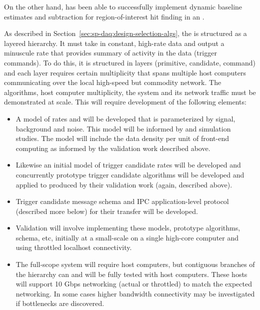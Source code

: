 On the other hand, \microboone has been able to
successfully implement dynamic baseline estimates and subtraction
for region-of-interest hit finding in an  \cite{NNN18}.


As described in Section~\ref{sec:sp-daq:design-selection-algs}, the  is structured as a layered hierarchy. 
It must take in constant, high-rate data and output a minuscule rate that provides summary of activity in the data (trigger commands).
To do this, it is structured in layers (primitive, candidate, command) and each layer requires certain multiplicity that spans multiple host computers communicating over the local high-speed but commodity network. 
The algorithms, host computer multiplicity, the  system and its network traffic must be demonstrated at scale.
This will require development of the following elements:

\begin{itemize}
\item A model of  rates and will be developed that is parameterized by signal, background and noise.  This model will be informed by  and simulation studies.  The model will include the data density per unit of front-end computing as informed by the  validation work described above.
\item Likewise an initial model of trigger candidate rates will be developed and concurrently prototype trigger candidate algorithms will be developed and applied to  produced by their validation work (again, described above).
\item Trigger candidate message schema and IPC application-level protocol (described more below) for their transfer will be developed.
\item Validation will involve implementing these models, prototype algorithms, schema, etc,  initially at a small-scale on a single high-core computer and using throttled localhost connectivity.
\item The full-scope system will require  host computers, but contiguous branches of the hierarchy can and will be fully tested with  host computers. 
  These hosts will support 10 Gbps networking (actual or throttled) to match the expected networking. 
  In some cases higher bandwidth connectivity may be investigated if bottlenecks are discovered. 
\end{itemize}



